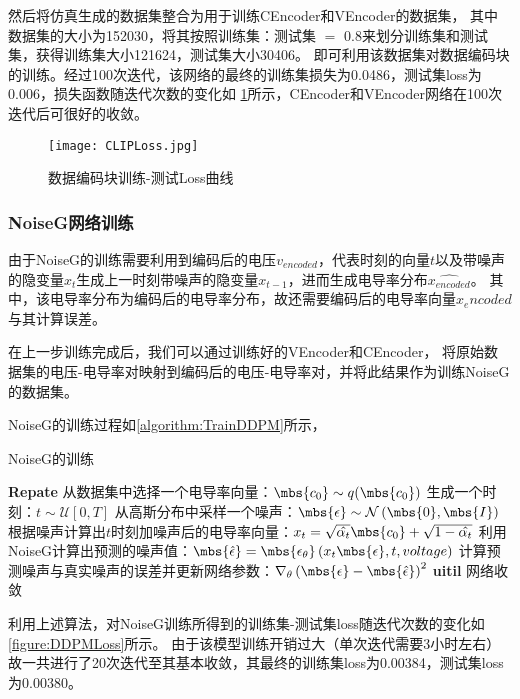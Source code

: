 然后将仿真生成的数据集整合为用于训练CEncoder和VEncoder的数据集，
其中数据集的大小为152030，将其按照训练集：测试集 $=$ 0.8来划分训练集和测试集，获得训练集大小121624，测试集大小30406。
即可利用该数据集对数据编码块的训练。经过100次迭代，该网络的最终的训练集损失为0.0486，测试集loss为0.006，损失函数随迭代次数的变化如
\cref{figure:CLIPLoss}所示，CEncoder和VEncoder网络在100次迭代后可很好的收敛。
\begin{figure}[h]
    \centering
    \texttt{[image: CLIPLoss.jpg]}
    \caption{数据编码块训练-测试Loss曲线}
    \label{figure:CLIPLoss}
\end{figure}

\subsubsection{NoiseG网络训练}

由于NoiseG的训练需要利用到编码后的电压$v_{encoded}$，代表时刻的向量$t$以及带噪声的隐变量$x_t$生成上一时刻带噪声的隐变量$x_{t-1}$，进而生成电导率分布$\hat{x_{encoded}}$。
其中，该电导率分布为编码后的电导率分布，故还需要编码后的电导率向量$x_encoded$与其计算误差。

在上一步训练完成后，我们可以通过训练好的VEncoder和CEncoder，
将原始数据集的电压-电导率对映射到编码后的电压-电导率对，并将此结果作为训练NoiseG的数据集。

NoiseG的训练过程如\cref{algorithm:TrainDDPM}所示，

\begin{algorithm}[H]
    
    \caption{NoiseG的训练}
    \begin{algorithmic}[1]
        \State \textbf{Repate}
        \State 从数据集中选择一个电导率向量：$\mbs{c_0} \sim q(\mbs{c_0})$
        \State 生成一个时刻：$t \sim \mathcal{U}\left[0, T\right]$
        \State 从高斯分布中采样一个噪声：$\mbs{\epsilon} \sim \mathcal{N}\left(\mbs{0}, \mbs{I}\right) $
        \State 根据噪声计算出$t$时刻加噪声后的电导率向量：$x_t = \sqrt{\hat{\alpha_t}}\mbs{c_0} + \sqrt{1-\hat{\alpha_t}}$
        \State 利用NoiseG计算出预测的噪声值：$\mbs{\hat{\epsilon}} = \mbs{\epsilon_{\theta}}\left(x_t\mbs{\epsilon}, t, voltage\right)$
        \State 计算预测噪声与真实噪声的误差并更新网络参数：$\nabla_\theta\left(\mbs{\epsilon} - \mbs{\hat{\epsilon}}\right)^2$
       \State \textbf{uitil} 网络收敛
    \end{algorithmic}
    \label{algorithm:TrainDDPM}
\end{algorithm}

利用上述算法，对NoiseG训练所得到的训练集-测试集loss随迭代次数的变化如\cref{figure:DDPMLoss}所示。
由于该模型训练开销过大（单次迭代需要3小时左右）故一共进行了20次迭代至其基本收敛，其最终的训练集loss为0.00384，测试集loss为0.00380。

